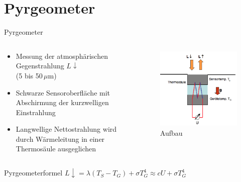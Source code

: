 \documentclass{beamer}
\begin{document}
\section{Pyrgeometer}
\begin{frame}{Pyrgeometer}
\begin{columns}
\begin{column}{0.6\textwidth}
\begin{itemize}
  \vfill\item Messung der atmosphärischen Gegenstrahlung $L\downarrow$\\
              (5 bis 50\,$\mu$m)
  \vfill\item Schwarze Sensoroberfläche mit Abschirmung der kurzwelligen
      Einstrahlung
  \vfill\item Langwellige Nettostrahlung wird durch Wärmeleitung in einer
      Thermosäule ausgeglichen
\vfill
\end{itemize}
\end{column}

\begin{column}{0.4\textwidth}
\begin{figure}[ht]
    \centering
    \includegraphics[width=1\textwidth]{figures/pyrgeometer_funktion.png}
    \caption{Aufbau}
    \label{fig:pyrgeometer_funktion}
\end{figure}
\end{column}
\end{columns}

\begin{alertblock}{Pyrgeometerformel}
  \centering$ L\downarrow = \lambda (T_S - T_G) + \sigma T_G^4 \approx cU + \sigma T_G^4 $
\end{alertblock}
\end{frame}
\end{document}
